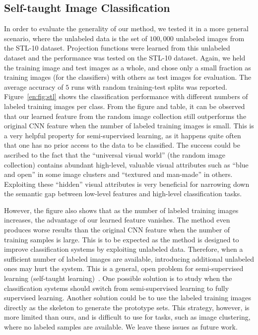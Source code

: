 \subsection{Self-taught Image Classification}
\label{en:sec:self}
In order to evaluate the generality of our method, we tested it in a
more general scenario, where the unlabeled data is the set of
$100,000$ unlabeled images from the STL-10 dataset. Projection
functions were learned from this unlabeled dataset and the performance
was tested on the STL-10 dataset. Again, we held the training image
and test images as a whole, and chose only a small fraction as
training images (for the classifiers) with others as test images for
evaluation.  The average accuracy of $5$ runs with random
training-test splits was reported.  Figure~\ref{en:fig:stl} shows the
classification performance with different numbers of labeled training
images per class.  From the figure and table, it can be observed that our
learned feature from the random image collection still outperforms the
original CNN feature when the number of labeled training images is
small.
This is a very helpful property for semi-supervised learning,
as it happens quite often that one has no prior access to the data to
be classified. The success could be ascribed to the fact that the
``universal visual world'' (the random image collection) contains
abundant high-level, valuable visual attributes such as ``blue and
open'' in some image clusters and ``textured and man-made'' in
others. Exploiting these ``hidden'' visual attributes is very
beneficial for narrowing down the semantic gap between low-level
features and high-level classification tasks.

However, the figure also shows that as the number of labeled training
images increases, the advantage of our learned feature vanishes. The
method even produces worse results than the original CNN feature when
the number of training samples is large.  This is to be expected as
the method is designed to improve classification systems by exploiting
unlabeled data. Therefore, when a sufficient
number of labeled images are available, introducing additional
unlabeled ones may hurt the system.  This is a general, open problem
for semi-supervised learning (self-taught
learning)~\citep{neverhurt:icml11}. One possible solution is to study
when the classification systems should switch from semi-supervised
learning to fully supervised learning. Another solution could be to
use the labeled training images directly as the skeleton to generate
the prototype sets. This strategy, however, is more limited than
ours, and is difficult to use for tasks, such as image
clustering, where no labeled samples are
available. We leave these issues as future work. 

